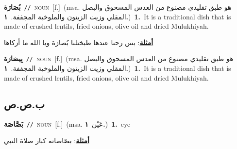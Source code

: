 \documentclass[10pt,a4paper,twoside]{article} %
\begin{document}
\begin{multicols}{2}
{\setlength\topsep{0pt}\textbf{\foreignlanguage{arabic}{بُصَارَة}}\ {\color{gray}\texttt{//}\color{black}}\ \textsc{noun}\ [f.]\ \color{gray}(msa. \foreignlanguage{arabic}{هو طبق تقليدي مصنوع من العدس المسحوق والبصل المقلي وزيت الزيتون والملوخية المجففة.}~\foreignlanguage{arabic}{\textbf{١.}})\color{black}\ \textbf{1.}~It is a traditional dish that is made of crushed lentils, fried onions, olive oil and dried Mulukhiyah.\  \begin{flushright}\color{gray}\foreignlanguage{arabic}{\textbf{\underline{\foreignlanguage{arabic}{أمثلة}}}: بس رحنا عندها طبختلنا بُصارَة ويا الله ما أزكاها}\end{flushright}\color{black}} \vspace{2mm}

{\setlength\topsep{0pt}\textbf{\foreignlanguage{arabic}{بِيصَارَة}}\ {\color{gray}\texttt{//}\color{black}}\ \textsc{noun}\ [f.]\ \color{gray}(msa. \foreignlanguage{arabic}{هو طبق تقليدي مصنوع من العدس المسحوق والبصل المقلي وزيت الزيتون والملوخية المجففة.}~\foreignlanguage{arabic}{\textbf{١.}})\color{black}\ \textbf{1.}~It is a traditional dish that is made of crushed lentils, fried onions, olive oil and dried Mulukhiyah.\ } \vspace{2mm}

\vspace{-3mm}
\subsection*{\color{blue}\foreignlanguage{arabic}{ب.ص.ص}\color{blue}{}} 

{\setlength\topsep{0pt}\textbf{\foreignlanguage{arabic}{بَصَّاصَة}}\ {\color{gray}\texttt{//}\color{black}}\ \textsc{noun}\ [f.]\ \color{gray}(msa. \foreignlanguage{arabic}{عَيْن}~\foreignlanguage{arabic}{\textbf{١.}})\color{black}\ \textbf{1.}~eye\  \begin{flushright}\color{gray}\foreignlanguage{arabic}{\textbf{\underline{\foreignlanguage{arabic}{أمثلة}}}: بصّاصاته كبار صلاة النبي}\end{flushright}\color{black}} \vspace{2mm}


\end{multicols}
\end{document}
